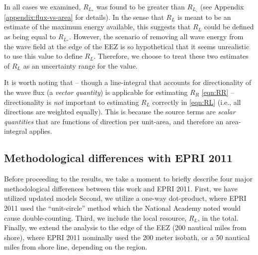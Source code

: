 In all cases we examined, $R_{L_*}$ was found to be greater than $R_{L_\circ}$ (see Appendix \ref{appendix:flux-vs-area} for details). In the sense that $R_L$ is meant to be an estimate of the maximum energy available, this suggests that $R_L$ could be defined as being equal to $R_{L_*}$. However, the scenario of removing all wave energy from the wave field at the edge of the EEZ is so hypothetical that it seems unrealistic to use this value to define $R_L$. Therefore, we choose to treat these two estimates of $R_L$ as an uncertainty range for the value.

It is worth noting that -- though a line-integral that accounts for directionality of the wave flux (a {\em vector quantity}) is applicable for estimating $R_R$ \eqref{eqn:RR} -- directionality is {\em not } important to estimating $R_L$ correctly in \eqref{eqn:RL} (i.e., all directions are weighted equally). This is because the source terms are {\em scalar quantities} that are functions of direction per unit-area, and therefore an area-integral applies.


\subsection{Methodological differences with EPRI 2011}
\label{sec:method:changes}

Before proceeding to the results, we take a moment to briefly describe four major methodological differences between this work and EPRI 2011. First, we have utilized updated models  Second, we utilize a one-way dot-product, where EPRI 2011 used the ``unit-circle'' method which the National Academy noted would cause double-counting. Third, we include the local resource, $R_L$, in the total. Finally, we extend the analysis to the edge of the EEZ (200 nautical miles from shore), where EPRI 2011 nominally used the 200 meter isobath, or a 50 nautical miles from shore line, depending on the region.

